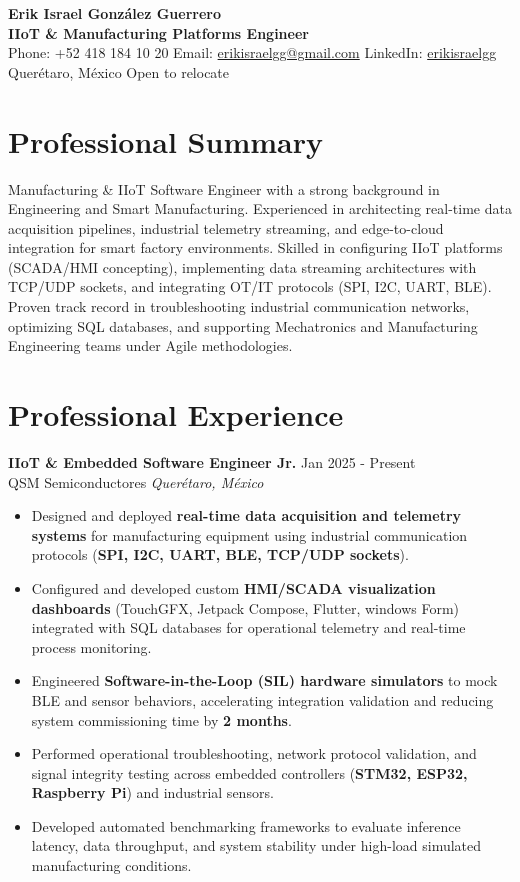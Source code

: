 \documentclass[10pt,a4paper]{article}
\newcommand{\workexp}[5]{
    \textbf{#1} \hfill #2\\
    \textcolor{primary}{#3} \hfill \textit{#4}\vspace{5pt}
    \begin{itemize}[leftmargin=*,nosep]
    #5
    \end{itemize}
    \vspace{5pt}
}
\begin{document}
\begin{center}
    {\Huge \textbf{Erik Israel González Guerrero}} \\ \vspace{3pt}
    {\large \textcolor{primary}{\textbf{IIoT \& Manufacturing Platforms Engineer}}} \\ \vspace{4pt}
    Phone: +52 418 184 10 20 \quad
    Email: \href{mailto:erikisraelgg@gmail.com}{erikisraelgg@gmail.com} \quad
    LinkedIn: \href{https://www.linkedin.com/in/erikisraelgg/}{erikisraelgg} \\
    Querétaro, México \quad Open to relocate
\end{center}

\section*{Professional Summary}
Manufacturing \& IIoT Software Engineer with a strong background in Engineering and Smart Manufacturing. Experienced in architecting real-time data acquisition pipelines, industrial telemetry streaming, and edge-to-cloud integration for smart factory environments. Skilled in configuring IIoT platforms (SCADA/HMI concepting), implementing data streaming architectures with TCP/UDP sockets, and integrating OT/IT protocols (SPI, I2C, UART, BLE). Proven track record in troubleshooting industrial communication networks, optimizing SQL databases, and supporting Mechatronics and Manufacturing Engineering teams under Agile methodologies.

\section*{Professional Experience}
\workexp{IIoT \& Embedded Software Engineer Jr.}{Jan 2025 - Present}{QSM Semiconductores}{Querétaro, México}{
    \item Designed and deployed \textbf{real-time data acquisition and telemetry systems} for manufacturing equipment using industrial communication protocols (\textbf{SPI, I2C, UART, BLE, TCP/UDP sockets}).
    \item Configured and developed custom \textbf{HMI/SCADA visualization dashboards} (TouchGFX, Jetpack Compose, Flutter, windows Form) integrated with SQL databases for operational telemetry and real-time process monitoring.
    \item Engineered \textbf{Software-in-the-Loop (SIL) hardware simulators} to mock BLE and sensor behaviors, accelerating integration validation and reducing system commissioning time by \textbf{2 months}.
    \item Performed operational troubleshooting, network protocol validation, and signal integrity testing across embedded controllers (\textbf{STM32, ESP32, Raspberry Pi}) and industrial sensors.
    \item Developed automated benchmarking frameworks to evaluate inference latency, data throughput, and system stability under high-load simulated manufacturing conditions.
}
\vspace{4pt}
\end{document}
